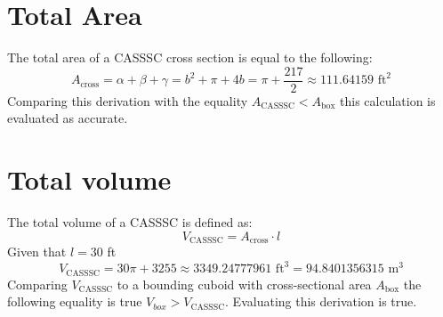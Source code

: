 \documentclass[12pt]{article}
\begin{document}
\section{Total Area}
The total area of a CASSSC cross section is equal to the following:
$$A_{\text{cross}} = \alpha + \beta +\gamma = b^2+ \pi + 4b = \pi + \frac{217}{2} \approx 111.64159 \text{ ft}^2$$
Comparing this derivation with the equality $A_{\text{CASSSC}} < A_{\text{box}}$ this calculation is evaluated as accurate. 
\section{Total volume} 
The total volume of a CASSSC is defined as:
$$V_{\text{CASSSC}} = A_{\text{cross}} \cdot l $$
Given that $l = 30$ ft
$$V_{\text{CASSSC}} = 30\pi + 3255 \approx \boxed{3349.24777961 \text{ ft}^3} = \boxed{94.8401356315 \text{ m}^3}$$
Comparing $V_{\text{CASSSC}}$ to a bounding cuboid with cross-sectional area $A_{\text{box}}$ the following equality is true $V_{box}> V_{\text{CASSSC}}$. Evaluating this derivation is true.  
\end{document}
